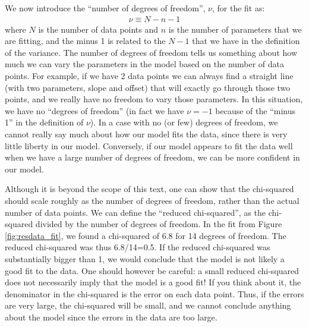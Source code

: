 We now introduce the ``number of degrees of freedom'', $\nu$, for the fit as:
\begin{align}
\nu\equiv N-n-1
\end{align}
where $N$ is the number of data points and $n$ is the number of parameters that we are fitting, and the minus 1 is related to the $N-1$ that we have in the definition of the variance. The number of degrees of freedom tells us something about how much we can vary the parameters in the model based on the number of data points. For example, if we have 2 data points we can always find a straight line (with two parameters, slope and offset) that will exactly go through those two points, and we really have no freedom to vary those parameters. In this situation, we have no ``degrees of freedom'' (in fact we have $\nu=-1$ because of the ``minus 1'' in the definition of $\nu$). In a case with no (or few) degrees of freedom, we cannot really say much about how our model fits the data, since there is very little liberty in our model. Conversely, if our model appears to fit the data well when we have a large number of degrees of freedom, we can be more confident in our model. 

Although it is beyond the scope of this text, one can show that the chi-squared should scale roughly as the number of degrees of freedom, rather than the actual number of data points. We can define the ``reduced chi-squared'', as the chi-squared divided by the number of degrees of freedom. In the fit from Figure \ref{fig:resdata_fit}, we found a chi-squared of 6.8 for 14 degrees of freedom. The reduced chi-squared was thus 6.8/14=0.5. If the reduced chi-squared was substantially bigger than 1, we would conclude that the model is not likely a good fit to the data. One should however be careful: a small reduced chi-squared does not necessarily imply that the model is a good fit! If you think about it, the denominator in the chi-squared is the error on each data point. Thus, if the errors are very large, the chi-squared will be small, and we cannot conclude anything about the model since the errors in the data are too large.

